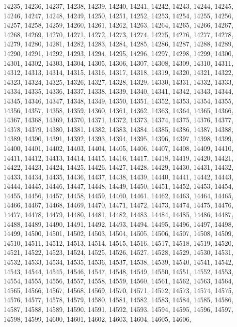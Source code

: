 14235,
14236,
14237,
14238,
14239,
14240,
14241,
14242,
14243,
14244,
14245,
14246,
14247,
14248,
14249,
14250,
14251,
14252,
14253,
14254,
14255,
14256,
14257,
14258,
14259,
14260,
14261,
14262,
14263,
14264,
14265,
14266,
14267,
14268,
14269,
14270,
14271,
14272,
14273,
14274,
14275,
14276,
14277,
14278,
14279,
14280,
14281,
14282,
14283,
14284,
14285,
14286,
14287,
14288,
14289,
14290,
14291,
14292,
14293,
14294,
14295,
14296,
14297,
14298,
14299,
14300,
14301,
14302,
14303,
14304,
14305,
14306,
14307,
14308,
14309,
14310,
14311,
14312,
14313,
14314,
14315,
14316,
14317,
14318,
14319,
14320,
14321,
14322,
14323,
14324,
14325,
14326,
14327,
14328,
14329,
14330,
14331,
14332,
14333,
14334,
14335,
14336,
14337,
14338,
14339,
14340,
14341,
14342,
14343,
14344,
14345,
14346,
14347,
14348,
14349,
14350,
14351,
14352,
14353,
14354,
14355,
14356,
14357,
14358,
14359,
14360,
14361,
14362,
14363,
14364,
14365,
14366,
14367,
14368,
14369,
14370,
14371,
14372,
14373,
14374,
14375,
14376,
14377,
14378,
14379,
14380,
14381,
14382,
14383,
14384,
14385,
14386,
14387,
14388,
14389,
14390,
14391,
14392,
14393,
14394,
14395,
14396,
14397,
14398,
14399,
14400,
14401,
14402,
14403,
14404,
14405,
14406,
14407,
14408,
14409,
14410,
14411,
14412,
14413,
14414,
14415,
14416,
14417,
14418,
14419,
14420,
14421,
14422,
14423,
14424,
14425,
14426,
14427,
14428,
14429,
14430,
14431,
14432,
14433,
14434,
14435,
14436,
14437,
14438,
14439,
14440,
14441,
14442,
14443,
14444,
14445,
14446,
14447,
14448,
14449,
14450,
14451,
14452,
14453,
14454,
14455,
14456,
14457,
14458,
14459,
14460,
14461,
14462,
14463,
14464,
14465,
14466,
14467,
14468,
14469,
14470,
14471,
14472,
14473,
14474,
14475,
14476,
14477,
14478,
14479,
14480,
14481,
14482,
14483,
14484,
14485,
14486,
14487,
14488,
14489,
14490,
14491,
14492,
14493,
14494,
14495,
14496,
14497,
14498,
14499,
14500,
14501,
14502,
14503,
14504,
14505,
14506,
14507,
14508,
14509,
14510,
14511,
14512,
14513,
14514,
14515,
14516,
14517,
14518,
14519,
14520,
14521,
14522,
14523,
14524,
14525,
14526,
14527,
14528,
14529,
14530,
14531,
14532,
14533,
14534,
14535,
14536,
14537,
14538,
14539,
14540,
14541,
14542,
14543,
14544,
14545,
14546,
14547,
14548,
14549,
14550,
14551,
14552,
14553,
14554,
14555,
14556,
14557,
14558,
14559,
14560,
14561,
14562,
14563,
14564,
14565,
14566,
14567,
14568,
14569,
14570,
14571,
14572,
14573,
14574,
14575,
14576,
14577,
14578,
14579,
14580,
14581,
14582,
14583,
14584,
14585,
14586,
14587,
14588,
14589,
14590,
14591,
14592,
14593,
14594,
14595,
14596,
14597,
14598,
14599,
14600,
14601,
14602,
14603,
14604,
14605,
14606,
